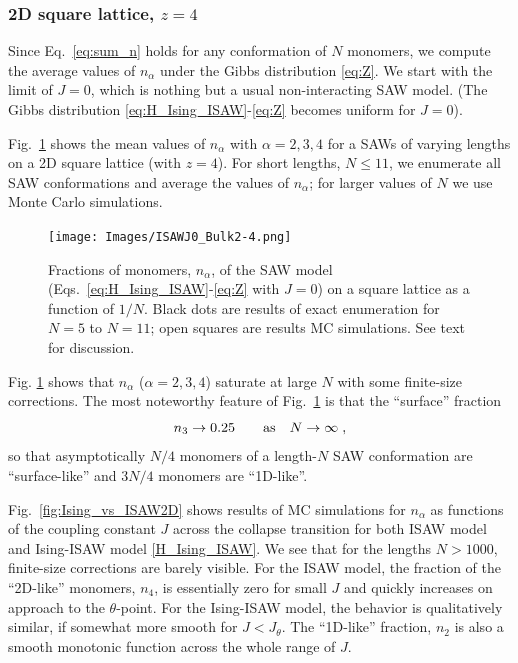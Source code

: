 \documentclass[a4paper]{jpconf}
\begin{document}
\subsubsection{2D square lattice, $z=4$}

Since Eq.\ \eqref{eq:sum_n} holds for any conformation of $N$ monomers, we
compute the average values of $n_\alpha$ under the Gibbs distribution \eqref{eq:Z}.
We start with the limit of $J=0$, which is nothing but a usual non-interacting SAW model.
(The Gibbs distribution \eqref{eq:H_Ising_ISAW}-\eqref{eq:Z}
becomes uniform for $J=0$).

Fig.\ \ref{fig:finite_size_SAW} shows the mean values of $n_\alpha$ with $\alpha=2, 3, 4$
for a SAWs of varying lengths on a 2D square lattice (with $z=4$).
For short lengths, $N \leqslant 11$, we enumerate all SAW conformations and
average the values of $n_\alpha$; for larger values of $N$ we use Monte Carlo simulations.
%
\begin{figure}[h!]
    \centering
    \texttt{[image: Images/ISAWJ0\_Bulk2-4.png]}
    \caption{Fractions of monomers, $n_\alpha$, of the SAW
model (Eqs.\ \eqref{eq:H_Ising_ISAW}-\eqref{eq:Z} with $J=0$) on a square lattice as a function
of $1/N$. Black dots are results of exact enumeration for $N = 5$ to $N=11$; 
open squares are results MC simulations. See text for discussion.}
    \label{fig:finite_size_SAW}
\end{figure}
%

Fig. \ref{fig:finite_size_SAW} shows that $n_\alpha$ ($\alpha=2, 3, 4$) saturate
at large $N$ with some finite-size corrections. The most noteworthy feature of
Fig.\ \ref{fig:finite_size_SAW} is that the ``surface'' fraction
%
$$
n_3 \to 0.25 \qquad\text{as\quad}N\to\infty \;,
$$
%
so that asymptotically $N/4$ monomers of a length-$N$ SAW conformation are ``surface-like'' and
$3 N/4$ monomers are ``1D-like''.


Fig.\ \ref{fig:Ising_vs_ISAW2D} shows results of MC simulations for
$n_\alpha$ as functions of the coupling constant $J$ across the collapse transition
for both ISAW model and Ising-ISAW model \eqref{H_Ising_ISAW}.
We see that for the lengths $N > 1000$, finite-size corrections are barely visible.
For the ISAW model,  the fraction of the ``2D-like'' monomers, $n_4$, is
essentially zero for small $J$ and quickly increases on approach to the $\theta$-point.
For the Ising-ISAW model, the behavior is qualitatively similar, if somewhat
more smooth for $J < J_\theta$. The ``1D-like'' fraction, $n_2$ is also a smooth
monotonic function across the whole range of $J$. 
\end{document}
